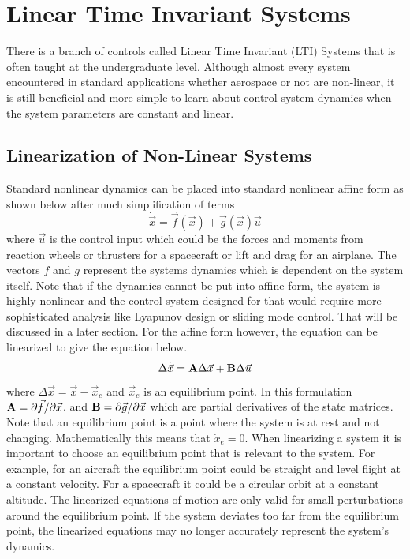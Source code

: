 \section{Linear Time Invariant Systems}

There is a branch of controls called Linear Time Invariant (LTI)
Systems that is often taught at the undergraduate level. Although
almost every system encountered in standard applications whether
aerospace or not are non-linear, it is still beneficial and more
simple to learn about control system dynamics when the system
parameters are constant and linear. 

\subsection{Linearization of Non-Linear Systems}

Standard nonlinear dynamics can be placed into standard
nonlinear affine form as shown below after much simplification of
terms
\begin{equation}
  \dot{\vec{x}} = \vec{f}(\vec{x}) + \vec{g}(\vec{x})\vec{u}
\end{equation}
where $\vec{u}$ is the control input which could be the forces and
moments from reaction wheels or thrusters for a spacecraft or lift and drag for an airplane. The vectors $f$ and $g$ represent the systems dynamics which is dependent on the system itself. Note that if the dynamics cannot be put into affine form, the system is highly nonlinear and the control system designed for that would require more sophisticated analysis like Lyapunov design or sliding mode control. That will be discussed in a later section. For the affine form however, the equation can be
linearized to give the equation below. 
\begin{equation}\label{e:linearize}
  \Delta \dot{\vec{x}} = {\bf A}\Delta {\vec{x}} + {\bf B}\Delta \vec{u}
\end{equation}
where $\Delta \vec{x} = \vec{x} - \vec{x}_e$ and $\vec{x}_e$ is an
equilibrium point. In this formulation ${\bf A} = \partial \vec{f}/\partial \vec{x}$. and 
${\bf B} = \partial \vec{g}/\partial \vec{x}$ which are partial derivatives of the state matrices. Note that an equilibrium point is a point where the system is at rest and not changing. Mathematically this means that $\dot{x}_e = 0$. When linearizing a system it is important to choose an equilibrium point that is relevant to the system. For example, for an aircraft the equilibrium point could be straight and level flight at a constant velocity. For a spacecraft it could be a circular orbit at a constant altitude. The linearized equations of motion are only valid for small perturbations around the equilibrium point. If the system deviates too far from the equilibrium point, the linearized equations may no longer accurately represent the system's dynamics.

